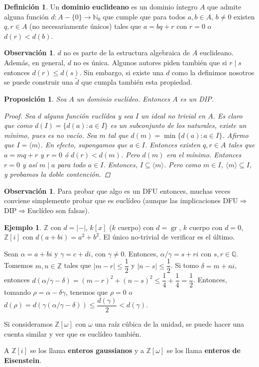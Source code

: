 \documentclass[12pt]{book}
\newtheorem{prop}[teo]{Proposición}
\theoremstyle{definition}
\newtheorem{obs}[teo]{Observación}
\newtheorem{defn}[teo]{Definición}
\newtheorem{ex}[teo]{Ejemplo}
\newcommand{\ZZ}{\mathbb{Z}}      %
\newcommand{\NN}{\mathbb{N}}
\newcommand{\QQ}{\mathbb{Q}}
\DeclareMathOperator{\gr}{gr}
\begin{document}
\begin{defn}
Un \textbf{dominio euclideano} es un dominio íntegro $A$ que admite alguna función $d:A-\{0\}\to \NN_0$ que cumple que para todos $a,b\in A$, $b\neq 0 $ existen $q,r\in A$ (no necesariamente únicos) tales que $a=bq+r$ con $r=0$ o $d(r)<d(b)$.
\end{defn}

\begin{obs}
$d$ no es parte de la estructura algebraica de $A$ euclideano. Además, en general, $d$ no es única. Algunos autores piden también que si $r\mid s$ entonces $d(r)\leq d(s)$. Sin embargo, si existe una $d$ como la definimos nosotros se puede construir una $\tilde{d}$ que cumpla también esta propiedad.
\end{obs}

\begin{prop}
Sea $A$ un dominio euclídeo. Entonces $A$ es un DIP.
\begin{proof}
Sea $d$ alguna función euclídea y sea $I$ un ideal no trivial en $A$. Es claro que como $d(I)= \{d(a):a\in I\}$ es un subconjunto de los naturales, existe un mínimo, pues es no vacío. Sea $m$ tal que $d(m) = \min\{d(a):a\in I\}$. Afirmo que $I = \langle m\rangle$. En efecto, supongamos que $a\in I$. Entonces existen $q,r\in A$ tales que $a = mq + r$ y $r=0$ ó $d(r)<d(m)$. Pero $d(m)$ era el mínimo. Entonces $r=0$ y así $m\mid a$ para todo $a\in I$. Entonces, $I\subseteq \langle m\rangle$. Pero como $m\in I$, $\langle m\rangle \subseteq I$, y probamos la doble contención.
\end{proof}
\end{prop}

\begin{obs}
Para probar que algo es un DFU entonces, muchas veces conviene simplemente probar que es euclídeo (aunque las implicaciones DFU$\Longrightarrow$DIP$\Longrightarrow$Euclídeo son falsas).
\end{obs}

\begin{ex}
$\ZZ$ con $d=|-|$, $k[x]$ ($k$ cuerpo) con $d=\gr$, $k$ cuerpo con $d=0$, $\ZZ[i]$ con $d(a+bi)= a^2 + b^2$.
El único no-trivial de verificar es el último.

Sean $\alpha = a+bi$ y $\gamma = c+di$, con $\gamma\neq 0$. Entonces, $\alpha / \gamma = s+ri$ con $s,r\in\QQ$. Tomemos $m,n\in\ZZ$ tales que $|m-r|\leq \dfrac{1}{2}$ y $|n-s|\leq \dfrac{1}{2}$. Si tomo $\delta= m+ni$, entonces $d(\alpha/\gamma - \delta) = (m-r)^2 + (n-s)^2 \leq \dfrac{1}{4} + \dfrac{1}{4} = \dfrac{1}{2}$. Entonces, tomando $\rho = \alpha - \delta \gamma$, tenemos que $\rho=0$ o $d(\rho) = d(\gamma (\alpha/\gamma - \delta)) \leq \dfrac{d(\gamma)}{2}<d(\gamma)$.

Si consideramos $\ZZ[\omega]$ con $\omega$ una raíz cúbica de la unidad, se puede hacer una cuenta similar y ver que es euclídeo también.

A $\ZZ[i]$ se los llama \textbf{enteros gaussianos} y a $\ZZ[\omega]$ se los llama \textbf{enteros de Eisenstein}.

\end{ex}
\end{document}
